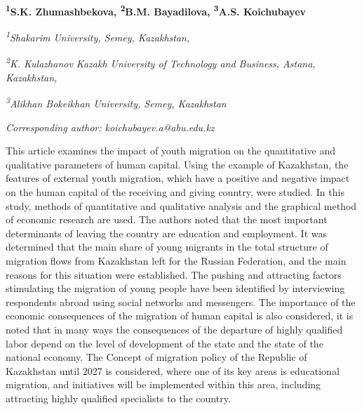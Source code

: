 
\begin{articleheader}

{\bfseries
\textsuperscript{1}S.K. Zhumashbekova\authorid,
\textsuperscript{2}B.M. Bayadilova\authorid,
\textsuperscript{3}A.S. Koichubayev\textsuperscript{\envelope } \authorid}
\end{articleheader}

\begin{affiliation}
\emph{\textsuperscript{1}Shakarim University, Semey, Kazakhstan,}

\emph{\textsuperscript{2}K. Kulazhanov Kazakh University of Technology and Business, Astana, Kazakhstan,}

\emph{\textsuperscript{3}Alikhan Bokeikhan University, Semey, Kazakhstan}

\raggedright \textsuperscript{\envelope }{\em Corresponding author: koichubayev.a@abu.edu.kz}
\end{affiliation}

This article examines the impact of youth migration on the quantitative
and qualitative parameters of human capital. Using the example of
Kazakhstan, the features of external youth migration, which have a
positive and negative impact on the human capital of the receiving and
giving country, were studied. In this study, methods of quantitative and
qualitative analysis and the graphical method of economic research are
used. The authors noted that the most important determinants of leaving
the country are education and employment. It was determined that the
main share of young migrants in the total structure of migration flows
from Kazakhstan left for the Russian Federation, and the main reasons
for this situation were established. The pushing and attracting factors
stimulating the migration of young people have been identified by
interviewing respondents abroad using social networks and messengers.
The importance of the economic consequences of the migration of human
capital is also considered, it is noted that in many ways the
consequences of the departure of highly qualified labor depend on the
level of development of the state and the state of the national economy.
The Concept of migration policy of the Republic of Kazakhstan until 2027
is considered, where one of its key areas is educational migration, and
initiatives will be implemented within this area, including attracting
highly qualified specialists to the country.

